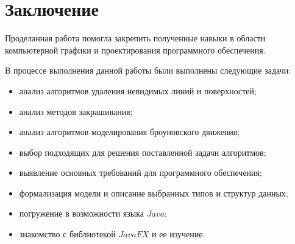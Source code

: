 \chapter*{Заключение}

Проделанная работа помогла закрепить полученные навыки в области компьютерной графики и проектирования программного обеспечения.

В процессе выполнения данной работы были выполнены следующие задачи:

\begin{itemize}
	\item анализ алгоритмов удаления невидимых линий и поверхностей;
	\item анализ методов закрашивания;
	\item анализ алгоритмов моделирования броуновского движения;
	\item выбор подходящих для решения поставленной задачи алгоритмов;
	\item выявление основных требований для программного обеспечения;
	\item формализация модели и описание выбранных типов и структур данных;
	\item погружение в возможности языка $Java$;
    \item знакомство с библиотекой $JavaFX$ и ее изучение.
\end{itemize}

